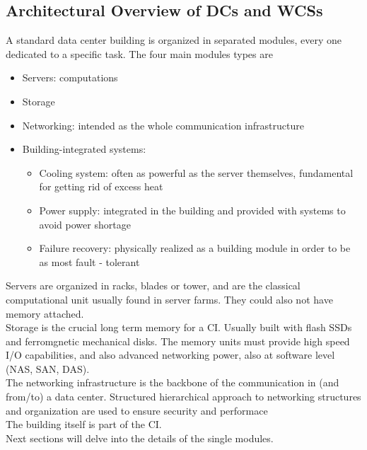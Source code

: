 \documentclass[10pt,a4paper]{article}
\begin{document}
			\subsection{Architectural Overview of DCs and WCSs}
				A standard data center building is organized in separated modules, every one dedicated to a specific task. The four main modules types are
				\begin{itemize}
					\item Servers: computations
					\item Storage
					\item Networking: intended as the whole communication infrastructure
					\item Building-integrated systems:
						\begin{itemize}
							\item Cooling system: often as powerful as the server themselves, fundamental for getting rid of excess heat
							\item Power supply: integrated in the building and provided with systems to avoid power shortage
							\item Failure recovery: physically realized as a building module in order to be as most fault - tolerant
						\end{itemize}
				\end{itemize}
				Servers are organized in racks, blades or tower, and are the classical computational unit usually found in server farms. They could also not have memory attached.\\
				Storage is the crucial long term memory for a CI. Usually built with flash SSDs and ferromgnetic mechanical disks. The memory units must provide high speed I/O capabilities, and also advanced networking power, also at software level (NAS, SAN, DAS).\\
				The networking infrastructure is the backbone of the communication in (and from/to) a data center. Structured hierarchical approach to networking structures and organization are used to ensure security and performace\\
				The building itself is part of the CI.\\
				Next sections will delve into the details of the single modules.
			
\end{document}
